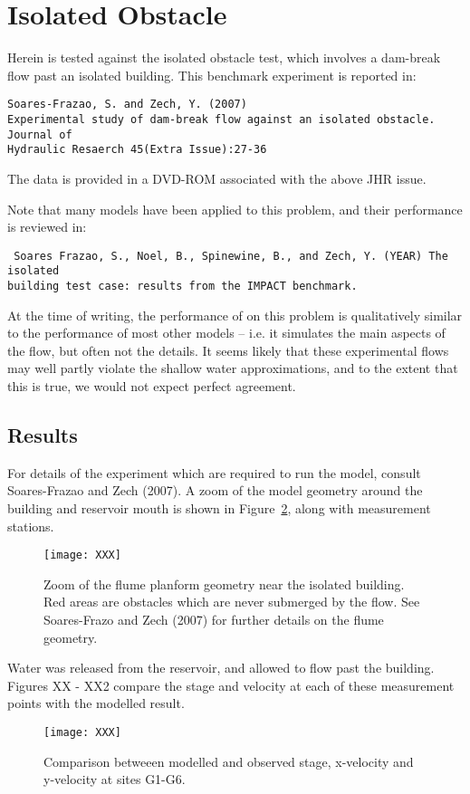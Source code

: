 
\section{Isolated Obstacle}

Herein \anuga{} is tested against the isolated obstacle test, which involves a dam-break flow past an isolated building. This benchmark experiment is reported in:
\begin{verbatim}
Soares-Frazao, S. and Zech, Y. (2007)
Experimental study of dam-break flow against an isolated obstacle. Journal of
Hydraulic Resaerch 45(Extra Issue):27-36
\end{verbatim}

The data is provided in a DVD-ROM associated with the above JHR issue.

Note that many models have been applied to this problem, and their performance is reviewed in:
\begin{verbatim}
 Soares Frazao, S., Noel, B., Spinewine, B., and Zech, Y. (YEAR) The isolated
building test case: results from the IMPACT benchmark.
\end{verbatim}
 At the time of writing, the performance of \anuga{} on this problem is qualitatively similar to the performance of most other models -- i.e. it simulates the main aspects of the flow, but often not the details. It seems likely that these experimental flows may well partly violate the shallow water approximations, and to the extent that this is true, we would not expect perfect agreement.

\subsection{Results}
For details of the experiment which are required to run the model, consult Soares-Frazao and Zech (2007). A zoom of the model geometry around the building and reservoir mouth is shown in Figure~\ref{urbanflow_geom}, along with measurement stations. 
\begin{figure}
\texttt{[image: XXX]}
\caption{Zoom of the flume planform geometry near the isolated building. Red areas are obstacles which are never submerged by the flow. See Soares-Frazo and Zech (2007) for further details on the flume geometry.}
\label{urbanflow_geom}
\end{figure}

Water was released from the reservoir, and allowed to flow past the building. Figures XX - XX2 compare the stage and velocity at each of these measurement points with the modelled result. 
\begin{figure}
\texttt{[image: XXX]}
\caption{Comparison betweeen modelled and observed stage, x-velocity and y-velocity at sites G1-G6.}
\label{urbanflow_geom}
\end{figure}



\endinput
